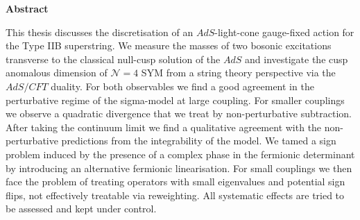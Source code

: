 %
%
\begin{center}
{\sffamily \bfseries\Large Abstract}\\
\end{center}%
\vspace{1cm}
%
This thesis discusses the discretisation of an $AdS$-light-cone gauge-fixed action for the Type IIB  superstring. We measure the masses of two bosonic excitations transverse to the classical null-cusp solution of the $AdS$  and investigate the cusp anomalous dimension of $\mathcal{N}=4$	SYM from a string theory perspective via the $AdS/CFT$ duality. For both observables we find a good agreement in the perturbative regime of the sigma-model at large  coupling. For smaller couplings we observe a quadratic divergence that we treat by non-perturbative subtraction. After taking the continuum limit we find a qualitative agreement with the non-perturbative predictions from the integrability of the model. We tamed a sign problem induced by the presence of a complex phase in the fermionic determinant by introducing an alternative fermionic linearisation. For small couplings we then face the problem of treating operators with small eigenvalues and potential sign flips, not effectively treatable via reweighting. All systematic effects are tried to be assessed and kept under control.\\
\vspace{1.5cm}

